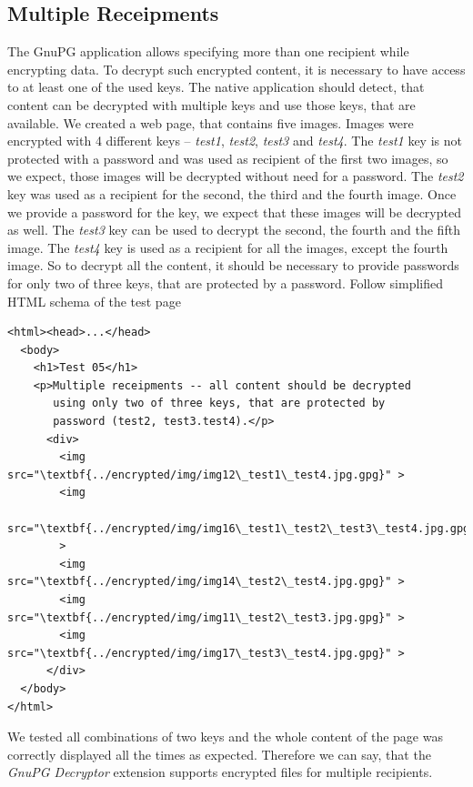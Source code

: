 \subsection{Multiple Receipments}
\label{test:receipment}

The GnuPG application allows specifying more than one recipient while encrypting data. To decrypt such encrypted content, it is necessary to have access to at least one of the used keys. The native application should detect, that content can be decrypted with multiple keys and use those keys, that are available. We created a web page, that contains five images. Images were encrypted with 4 different keys -- \textit{test1}, \textit{test2}, \textit{test3} and \textit{test4}. The \textit{test1} key is not protected with a password and was used as recipient of the first two images, so we expect, those images will be decrypted without need for a password. The \textit{test2} key was used as a recipient for
the second, the third and the fourth image. Once we provide a password for the key, we expect that these images will be decrypted as well. The \textit{test3} key can be used to decrypt the second, the fourth and the fifth image. The \textit{test4} key is used as a recipient for all the images, except the fourth image. So to decrypt all the content, it should be necessary to provide passwords for only two of three keys, that are protected by a password. Follow simplified HTML schema of the test page

\begin{Verbatim}[commandchars=\\\{\},codes={\catcode`$=3\catcode`_=8},samepage=false,frame=single]
<html><head>...</head>
  <body>
    <h1>Test 05</h1>
    <p>Multiple receipments -- all content should be decrypted
       using only two of three keys, that are protected by
       password (test2, test3.test4).</p>
      <div>
        <img src="\textbf{../encrypted/img/img12\_test1\_test4.jpg.gpg}" >
        <img
          src="\textbf{../encrypted/img/img16\_test1\_test2\_test3\_test4.jpg.gpg}"
        >
        <img src="\textbf{../encrypted/img/img14\_test2\_test4.jpg.gpg}" >
        <img src="\textbf{../encrypted/img/img11\_test2\_test3.jpg.gpg}" >
        <img src="\textbf{../encrypted/img/img17\_test3\_test4.jpg.gpg}" >
      </div>
  </body>
</html>
\end{Verbatim}

We tested all combinations of two keys and the whole content of the page was correctly displayed all the times as expected. Therefore we can say, that the \textit{GnuPG Decryptor} extension supports encrypted files for multiple recipients.

